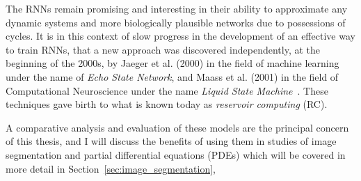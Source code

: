 \documentclass{WitsPhysicsReport}
\begin{document}
The RNNs remain promising and interesting in their ability to approximate any dynamic systems and more biologically plausible networks due to possessions of cycles.  It is in this context of slow progress in the development of an effective way to train RNNs, that a new approach was discovered independently, at the beginning of the 2000s, by  Jaeger et al. (2000) in the field of machine learning under the name of \textit{Echo State Network}, and  Maass et al. (2001) in the field of Computational Neuroscience under the name \textit{Liquid State Machine}~\cite{jaeger2001echo,maass2002real}. These techniques gave birth to what is known today as \textit{reservoir computing} (RC).

A comparative analysis and evaluation of these models are the principal concern of this thesis, and I will discuss the benefits of using them in studies of image segmentation and partial differential equations (PDEs) which will be covered in more detail in Section~\ref{sec:image_segmentation}, %

\newpage
\end{document}
